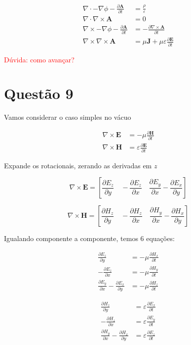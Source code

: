 \begin{align*}
\nabla \cdot -\nabla \phi - \frac{\partial \mathbf{A}}{\partial t} &= \frac{\rho}{\varepsilon} \\
\nabla \cdot \nabla \times \mathbf{A} &= 0 \\
\nabla \times -\nabla \phi - \frac{\partial \mathbf{A}}{\partial t} &= -\frac{\partial \nabla \times \mathbf{A}}{\partial t} \\
\nabla \times \nabla \times \mathbf{A} &= \mu \mathbf{J} + \mu \varepsilon \frac{\partial \mathbf{E}}{\partial t}
\end{align*}

\textcolor{red}{Dúvida: como avançar?}

\chapter{Questão 9}\label{cap:q9}

Vamos considerar o caso simples no vácuo

\begin{align}
\nabla \times \mathbf{E} &= -\mu \frac{\partial \mathbf{H}}{\partial t} \\
\nabla \times \mathbf{H} &= \varepsilon \frac{\partial \mathbf{E}}{\partial t}
\end{align}

Expande os rotacionais, zerando as derivadas em $z$

\[
\nabla \times \mathbf{E} =
\left[
\frac{\partial E_z}{\partial y} \quad
-\frac{\partial E_z}{\partial x} \quad
\frac{\partial E_y}{\partial x} - \frac{\partial E_x}{\partial y}
\right]
\]

\[
\nabla \times \mathbf{H} =
\left[
\frac{\partial H_z}{\partial y} \quad
-\frac{\partial H_z}{\partial x} \quad
\frac{\partial H_y}{\partial x} - \frac{\partial H_x}{\partial y}
\right]
\]

Igualando componente a componente, temos 6 equações: 


\begin{align*}
\frac{\partial E_z}{\partial y} &= -\mu \frac{\partial H_x}{\partial t} \\
-\frac{\partial E_z}{\partial x} &= -\mu \frac{\partial H_y}{\partial t} \\
\frac{\partial E_y}{\partial x} - \frac{\partial E_x}{\partial y}
&= -\mu \frac{\partial H_z}{\partial t}
\end{align*}

\begin{align*}
\frac{\partial H_z}{\partial y} &= \varepsilon \frac{\partial E_x}{\partial t} \\
-\frac{\partial H_z}{\partial x} &= \varepsilon \frac{\partial E_y}{\partial t} \\
\frac{\partial H_y}{\partial x} - \frac{\partial H_x}{\partial y}
&= \varepsilon \frac{\partial E_z}{\partial t}
\end{align*}

